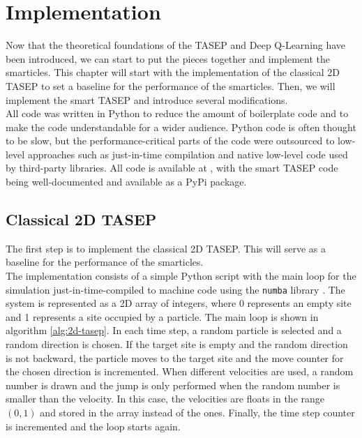 \graphicspath{{img/impl/out}{img/impl}}

\chapter{Implementation}
\label{ch:implementation}
Now that the theoretical foundations of the TASEP and Deep Q-Learning have been introduced, we can start to put the pieces together and implement the smarticles. This chapter will start with the implementation of the classical 2D TASEP to set a baseline for the performance of the smarticles. Then, we will implement the smart TASEP and introduce several modifications. 
\\
All code was written in Python to reduce the amount of boilerplate code and to make the code understandable for a wider audience. Python code is often thought to be slow, but the performance-critical parts of the code were outsourced to low-level approaches such as just-in-time compilation and native low-level code used by third-party libraries. 
All code is available at \cite{maertens_smarttasep_github_2023}, with the smart TASEP code being well-documented and available as a PyPi package.

\section{Classical 2D TASEP}
\label{sec:implementation-classical-2d-tasep}
The first step is to implement the classical 2D TASEP. This will serve as a baseline for the performance of the smarticles. 
\\
The implementation consists of a simple Python script with the main loop for the simulation just-in-time-compiled to machine code using the \texttt{numba} library \cite{lam_numba_2015}. The system is represented as a 2D array of integers, where 0 represents an empty site and 1 represents a site occupied by a particle. The main loop is shown in algorithm \ref{alg:2d-tasep}. In each time step, a random particle is selected and a random direction is chosen. If the target site is empty and the random direction is not backward, the particle moves to the target site and the move counter for the chosen direction is incremented. When different velocities are used, a random number is drawn and the jump is only performed when the random number is smaller than the velocity. In this case, the velocities are floats in the range $(0,1)$ and stored in the array instead of the ones. Finally, the time step counter is incremented and the loop starts again.

